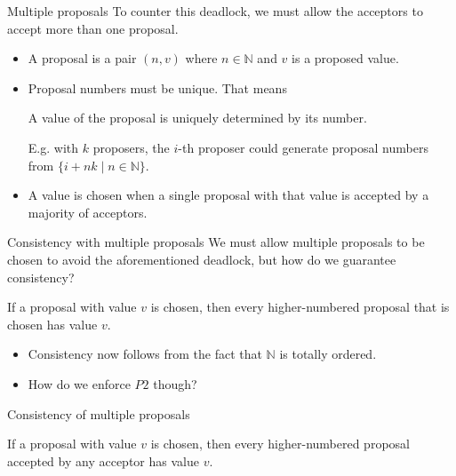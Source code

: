 \documentclass{beamer}
\begin{document}
\begin{frame}{Multiple proposals}
  To counter this deadlock, we must allow the acceptors to accept more than one proposal.
  \begin{itemize}
    \item A proposal is a pair $(n, v)$ where $n \in \mathbb{N}$ and $v$ is a proposed value.
    \item Proposal numbers \alert{must be unique}. That means
    \begin{invariant}[P3]
      A value of the proposal is uniquely determined by its number.
    \end{invariant}
    
    {\small E.g. with $k$ proposers, the $i$-th proposer could generate proposal numbers from $\{ i + nk \mid n \in \mathbb{N} \}$.}
    \item A value is chosen when a \alert{single proposal with that value} is accepted by a majority of acceptors.
  \end{itemize}
\end{frame}

\begin{frame}{Consistency with multiple proposals}
  We must allow multiple proposals to be chosen to avoid the aforementioned deadlock, but how do we guarantee consistency?
  \begin{invariant}[P2]
    If a proposal with value $v$ is chosen, then every higher-numbered proposal that is chosen has value $v$.
  \end{invariant}
  \begin{itemize}
    \item Consistency now follows from the fact that $\mathbb{N}$ is totally ordered.
    \item How do we enforce $P2$ though?
  \end{itemize}
\end{frame}

\begin{frame}{Consistency of multiple proposals}
  \begin{invariant}[$P2^a$]
    If a proposal with value $v$ is chosen, then every higher-numbered proposal accepted by \alert{any} acceptor has value $v$.
  \end{invariant}
\end{frame}
\end{document}
